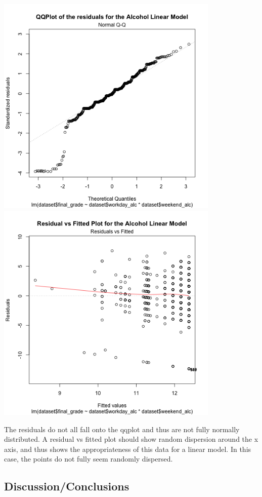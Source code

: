 \documentclass[]{article}
\begin{document}
\includegraphics[width=0.8\textwidth,height=\textheight]{images/residual_plot_qq.png}
\includegraphics[width=0.8\textwidth,height=\textheight]{images/residual_fitted_plot.png}

The residuals do not all fall onto the qqplot and thus are not fully
normally distributed. A residual vs fitted plot should show random
dispersion around the x axis, and thus shows the appropriateness of this
data for a linear model. In this case, the points do not fully seem
randomly dispersed.

\hypertarget{discussionconclusions}{%
\subsection{Discussion/Conclusions}\label{discussionconclusions}}
\end{document}
